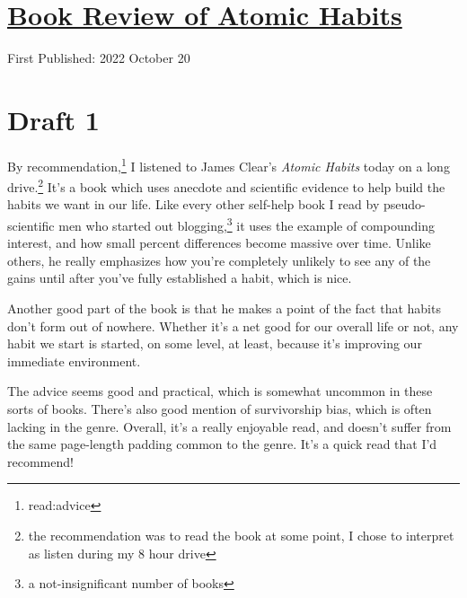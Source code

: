 \documentclass[12pt]{article}[titlepage]
\newcommand{\1}{\={a}}
\newcommand{\2}{\={e}}
\newcommand{\3}{\={\i}}
\newcommand{\4}{\=o}
\newcommand{\5}{\=u}
\newcommand{\6}{\={A}}
\renewcommand{\,}{\textsuperscript{,}}
\begin{document}
\doublespacing
\section{\href{book-review-atomic-habits.html}{Book Review of Atomic Habits}}
First Published: 2022 October 20
\section{Draft 1}
By recommendation,\footnote{read:advice} I listened to James Clear's \textit{Atomic Habits} today on a long drive.\footnote{the recommendation was to read the book at some point, I chose to interpret as listen during my 8 hour drive}
It's a book which uses anecdote and scientific evidence to help build the habits we want in our life.
Like every other self-help book I read by pseudo-scientific men who started out blogging,\footnote{a not-insignificant number of books} it uses the example of compounding interest, and how small percent differences become massive over time.
Unlike others, he really emphasizes how you're completely unlikely to see any of the gains until after you've fully established a habit, which is nice.

Another good part of the book is that he makes a point of the fact that habits don't form out of nowhere.
Whether it's a net good for our overall life or not, any habit we start is started, on some level, at least, because it's improving our immediate environment.

The advice seems good and practical, which is somewhat uncommon in these sorts of books.
There's also good mention of survivorship bias, which is often lacking in the genre.
Overall, it's a really enjoyable read, and doesn't suffer from the same page-length padding common to the genre.
It's a quick read that I'd recommend!
\end{document}
